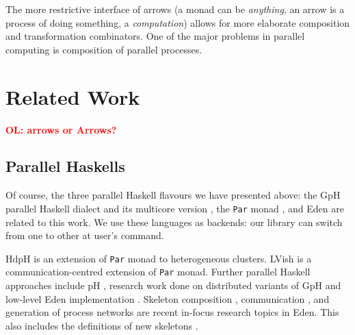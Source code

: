\documentclass{jfp1}
\renewcommand{\cite}[1]{\citep{#1}}
\newcommand{\inlinecode}[1]{\texttt{#1}}
\newcommand{\comm}[2]{\textcolor{red}{\bfseries #1: #2}}
\newcommand{\olcomment}[1]{\comm{OL}{#1}}
\begin{document}
%

The more restrictive interface of arrows (a monad can be \emph{anything}, an arrow is a process of doing something, a \emph{computation}) allows for more elaborate composition and transformation combinators. One of the major problems in parallel computing is composition of parallel processes.


	\section{Related Work}
\label{sec:related-work}

\olcomment{arrows or Arrows?}

\subsection{Parallel Haskells}
Of course, the three parallel Haskell flavours we have presented above: the GpH \cite{Trinder1998a,Trinder1999} parallel Haskell dialect and its multicore version \cite{Marlow2009}, the \inlinecode{Par} monad \cite{par-monad,Foltzer:2012:MPC:2398856.2364562}, and Eden \cite{eden,Loogen2012} are related to this work. We use these languages as backends: our library can switch from one to other at user's command.

HdpH \cite{Maier:2014:HDS:2775050.2633363,stewart_maier_trinder_2016} is an extension of \inlinecode{Par} monad to heterogeneous clusters. LVish \cite{Kuper:2014:TPE:2666356.2594312} is a communication-centred extension of \inlinecode{Par} monad.
%
Further parallel Haskell approaches include pH \cite{ph-book}, research work done on distributed variants of GpH \cite{Trinder1996,Aljabri:2013:DIG:2620678.2620682,Aljabri2015} and low-level Eden implementation \cite{JostThesis,berthold_loidl_hammond_2016}. Skeleton composition \cite{dieterle_horstmeyer_loogen_berthold_2016}, communication \cite{Dieterle2010}, and generation of process networks \cite{Horstmeyer2013} are recent in-focus research topics in Eden. This also includes the definitions of new skeletons \cite{doi:10.1142/S0129626403001380,Eden:PARCO05,Berthold2009-mr,Berthold2009-fft,brown2010ever,dieterle2010skeleton,delaEncina2011,Dieterle2013}.
\end{document}
